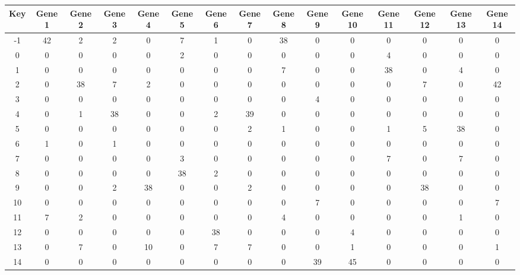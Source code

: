 \begin{tabular}{|c|c|c|c|c|c|c|c|c|c|c|c|c|c|c|}
\hline
Key & Gene 1 & Gene 2 & Gene 3 & Gene 4 & Gene 5 & Gene 6 & Gene 7 & Gene 8 & Gene 9 & Gene 10 & Gene 11 & Gene 12 & Gene 13 & Gene 14 \\
\hline
-1 & 42 & 2 & 2 & 0 & 7 & 1 & 0 & 38 & 0 & 0 & 0 & 0 & 0 & 0 \\
0 & 0 & 0 & 0 & 0 & 2 & 0 & 0 & 0 & 0 & 0 & 4 & 0 & 0 & 0 \\
1 & 0 & 0 & 0 & 0 & 0 & 0 & 0 & 7 & 0 & 0 & 38 & 0 & 4 & 0 \\
2 & 0 & 38 & 7 & 2 & 0 & 0 & 0 & 0 & 0 & 0 & 0 & 7 & 0 & 42 \\
3 & 0 & 0 & 0 & 0 & 0 & 0 & 0 & 0 & 4 & 0 & 0 & 0 & 0 & 0 \\
4 & 0 & 1 & 38 & 0 & 0 & 2 & 39 & 0 & 0 & 0 & 0 & 0 & 0 & 0 \\
5 & 0 & 0 & 0 & 0 & 0 & 0 & 2 & 1 & 0 & 0 & 1 & 5 & 38 & 0 \\
6 & 1 & 0 & 1 & 0 & 0 & 0 & 0 & 0 & 0 & 0 & 0 & 0 & 0 & 0 \\
7 & 0 & 0 & 0 & 0 & 3 & 0 & 0 & 0 & 0 & 0 & 7 & 0 & 7 & 0 \\
8 & 0 & 0 & 0 & 0 & 38 & 2 & 0 & 0 & 0 & 0 & 0 & 0 & 0 & 0 \\
9 & 0 & 0 & 2 & 38 & 0 & 0 & 2 & 0 & 0 & 0 & 0 & 38 & 0 & 0 \\
10 & 0 & 0 & 0 & 0 & 0 & 0 & 0 & 0 & 7 & 0 & 0 & 0 & 0 & 7 \\
11 & 7 & 2 & 0 & 0 & 0 & 0 & 0 & 4 & 0 & 0 & 0 & 0 & 1 & 0 \\
12 & 0 & 0 & 0 & 0 & 0 & 38 & 0 & 0 & 0 & 4 & 0 & 0 & 0 & 0 \\
13 & 0 & 7 & 0 & 10 & 0 & 7 & 7 & 0 & 0 & 1 & 0 & 0 & 0 & 1 \\
14 & 0 & 0 & 0 & 0 & 0 & 0 & 0 & 0 & 39 & 45 & 0 & 0 & 0 & 0 \\
\hline
\end{tabular}